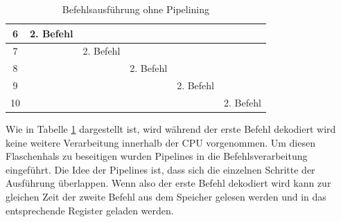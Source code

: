 \documentclass[a4paper,12pt]{article}
\begin{document}
\begin{table}[!htb]
\begin{tabular}{|c|l|l|l|l|l|}
6    & 2. Befehl                                                                        &                                 &                                                                                 &                                &                                                                                            \\ \hline
7    &                                                                                  & 2. Befehl                       &                                                                                 &                                &                                                                                            \\ \hline
8    &                                                                                  &                                 & 2. Befehl                                                                       &                                &                                                                                            \\ \hline
9    &                                                                                  &                                 &                                                                                 & 2. Befehl                      &                                                                                            \\ \hline
10   &                                                                                  &                                 &                                                                                 &                                & 2. Befehl                                                                                  \\ \hline


\end{tabular}
\caption{Befehlsausführung ohne Pipelining \protect\cite{mikroprozessortechnik2011}}
\label{noPipeline}
\end{table}

\par\bigskip\noindent Wie in Tabelle \ref{noPipeline} dargestellt ist, wird während der erste Befehl dekodiert wird keine weitere Verarbeitung innerhalb der CPU vorgenommen. Um diesen Flaschenhals zu beseitigen wurden Pipelines in die Befehlsverarbeitung eingeführt. Die Idee der Pipelines ist, dass sich die einzelnen Schritte der Ausführung überlappen. Wenn also der erste Befehl dekodiert wird kann zur gleichen Zeit der zweite Befehl aus dem Speicher gelesen werden und in das entsprechende Register geladen werden.
\end{document}
